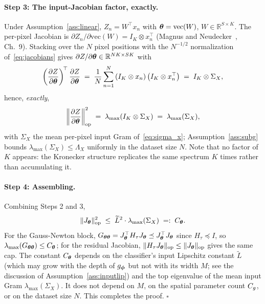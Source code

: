 \paragraph{Step 3: The input-Jacobian factor, exactly.}
Under Assumption~\ref{ass:linear}, $Z_n = W^\top x_n$
with ${\boldsymbol{\theta}} = \mathrm{vec}(W)$, $W \in \mathbb{R}^{S \times K}$. The
per-pixel Jacobian is
$\partial Z_n / \partial \mathrm{vec}(W) = I_K \otimes x_n^\top$
(Magnus and Neudecker~\cite{magnus1988matrix}, Ch.~9). Stacking over
the $N$ pixel positions with the $N^{-1/2}$ normalization
of~\eqref{eq:jacobians} gives $\partial Z / \partial {\boldsymbol{\theta}} \in
\mathbb{R}^{NK \times SK}$ with
\[
    \left( \frac{\partial Z}{\partial {\boldsymbol{\theta}}} \right)^{\!\top}
    \frac{\partial Z}{\partial {\boldsymbol{\theta}}}
    \;=\; \frac{1}{N}\sum_{n=1}^{N} \left( I_K \otimes x_n \right)
          \left( I_K \otimes x_n^\top \right)
    \;=\; I_K \otimes \Sigma_X ,
\]
hence, \emph{exactly},
\[
    \left\| \frac{\partial Z}{\partial {\boldsymbol{\theta}}} \right\|_{\mathrm{op}}^{2}
    \;=\; \lambda_{\max}(I_K \otimes \Sigma_X)
    \;=\; \lambda_{\max}(\Sigma_X),
\]
with $\Sigma_X$ the mean per-pixel input Gram of~\eqref{eq:sigma_x};
Assumption~\ref{ass:subg} bounds
$\lambda_{\max}(\Sigma_X) \leq \Lambda_X$ uniformly in the dataset
size $N$. Note that no factor of $K$ appears: the
Kronecker structure replicates the same spectrum $K$ times rather
than accumulating it.

\paragraph{Step 4: Assembling.}
Combining Steps 2 and 3,
\[
    \|J_{\boldsymbol{\theta}}\|_{\mathrm{op}}^{2}
    \;\leq\; \widetilde{L}^{2} \cdot \lambda_{\max}(\Sigma_X)
    \;=:\; C_{\boldsymbol{\theta}} .
\]
For the Gauss-Newton block, $G_{{\boldsymbol{\theta}}{\boldsymbol{\theta}}} = J_{\boldsymbol{\theta}}^\top
H_\tau J_{\boldsymbol{\theta}} \preceq J_{\boldsymbol{\theta}}^\top J_{\boldsymbol{\theta}}$ since
$H_\tau \preceq I$, so $\lambda_{\max}(G_{{\boldsymbol{\theta}}{\boldsymbol{\theta}}}) \leq
C_{\boldsymbol{\theta}}$; for the residual Jacobian,
$\|H_\tau J_{\boldsymbol{\theta}}\|_{\mathrm{op}} \leq \|J_{\boldsymbol{\theta}}\|_{\mathrm{op}}$
gives the same cap. The constant $C_{\boldsymbol{\theta}}$ depends on the
classifier's input Lipschitz constant $\widetilde{L}$ (which may grow
with the depth of $g_{\boldsymbol{\phi}}$ but not with its width $M$; see the
discussion of Assumption~\ref{ass:inputlip}) and the top eigenvalue
of the mean input Gram $\lambda_{\max}(\Sigma_X)$. It does not depend
on $M$, on the spatial parameter count $C_g$, or on the dataset size
$N$. This completes the proof.
\hfill$\square$

